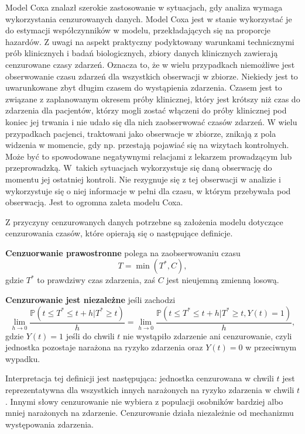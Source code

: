Model Coxa znalazł szerokie zastosowanie w sytuacjach, gdy analiza wymaga wykorzystania cenzurowanych danych. Model Coxa jest w stanie wykorzystać je do estymacji współczynników w modelu, przekładających się na proporcje hazardów. Z uwagi na aspekt praktyczny podyktowany warunkami technicznymi prób klinicznych i badań biologicznych, zbiory danych klinicznych zawierają cenzurowane czasy zdarzeń. Oznacza to, że w wielu przypadkach niemożliwe jest obserwowanie czasu zdarzeń dla wszystkich obserwacji w zbiorze. Niekiedy jest to uwarunkowane zbyt długim czasem do wystąpienia zdarzenia. Czasem jest to związane z zaplanowanym okresem próby klinicznej, który jest krótszy niż czas do zdarzenia dla pacjentów, którzy mogli zostać włączeni do próby klinicznej pod koniec jej trwania i nie udało się dla nich zaobserwować czasów zdarzeń. W wielu przypadkach pacjenci, traktowani jako obserwacje w zbiorze, znikają z pola widzenia w momencie, gdy np. przestają pojawiać się na wizytach kontrolnych. Może być to spowodowane negatywnymi relacjami z lekarzem prowadzącym lub przeprowadzką. W~takich sytuacjach wykorzystuje się daną obserwację do momentu jej ostatniej kontroli. Nie rezygnuje się z tej obserwacji w analizie i wykorzystuje się o niej informacje w pełni dla czasu, w którym przebywała pod obserwacją. Jest to ogromna zaleta modelu Coxa.

Z przyczyny cenzurowanych danych potrzebne są założenia modelu dotyczące cenzurowania czasów, które opierają się o następujące definicje.

\begin{definition}
\textbf{Cenzuorwanie prawostronne} polega na zaobserwowaniu czasu 
$$T= \min(T^*, C),$$
gdzie $T^*$ to prawdziwy czas zdarzenia, zaś $C$ jest nieujemną zmienną losową.
\end{definition}


\begin{definition}
\textbf{Cenzurowanie jest niezależne} jeśli zachodzi
$$ \lim\limits_{h\rightarrow 0}\dfrac{\mathbb{P}(t \leq T^* \leq t +h | T^* \geq t)}{h} =  \lim\limits_{h\rightarrow 0}\dfrac{\mathbb{P}(t \leq T^* \leq t +h | T^* \geq t, Y(t) = 1)}{h},$$
gdzie $Y(t) = 1$ jeśli do chwili $t$ nie wystąpiło zdarzenie ani cenzurowanie, czyli jednostka pozostaje narażona na ryzyko zdarzenia oraz $Y(t)=0$ w przeciwnym wypadku.
\end{definition}

Interpretacja tej definicji jest następująca: jednostka cenzurowana w chwili $t$ jest reprezentatywna dla wszystkich innych narażonych na ryzyko zdarzenia w chwili $t$. Innymi słowy cenzurowanie nie wybiera z populacji osobników bardziej albo mniej narażonych na zdarzenie. Cenzurowanie działa niezależnie od mechanizmu występowania zdarzenia.


